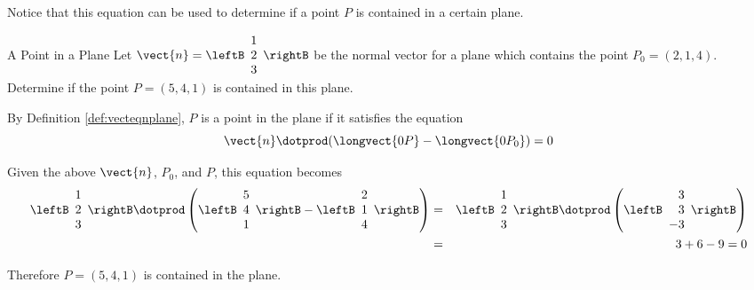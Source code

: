Notice that this equation can be used to determine if a point $P$ is contained in a certain plane. 

\begin{example}{A Point in a Plane}\label{exa:pointplane}
Let $\vect{n} = 
\leftB
\begin{array}{r}
1 \\
2 \\
3 
\end{array}
\rightB$ be the normal vector for a plane which contains the point $P_0 = \left( 2, 1, 4 \right)$. Determine if the point $P = \left( 5, 4, 1 \right)$ is contained in this plane. 
\end{example}

\begin{solution}
By Definition \ref{def:vecteqnplane}, $P$ is a point in the plane if it satisfies the equation
\[
\vect{n} \dotprod (\longvect{0P} - \longvect{0P_0}) = 0
\]

Given the above $\vect{n}$, $P_0$, and $P$, this equation becomes
\begin{eqnarray*}
\leftB
\begin{array}{r}
1 \\
2 \\
3
\end{array}
\rightB
\dotprod
\left(
\leftB
\begin{array}{r}
5 \\
4 \\
1
\end{array}
\rightB
-
\leftB
\begin{array}{r}
2 \\
1 \\
4
\end{array}
\rightB
\right)
&=& 
\leftB
\begin{array}{r}
1 \\
2 \\
3
\end{array}
\rightB
\dotprod
\left(
\leftB
\begin{array}{r}
3 \\
3 \\
-3
\end{array}
\rightB
\right) \\
&=& 
3 + 6 - 9 = 0
\end{eqnarray*}

Therefore $P = ( 5, 4, 1)$ is contained in the plane.

\end{solution}

